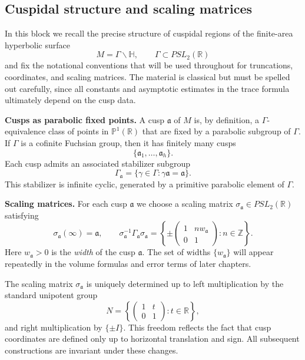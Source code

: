 
\subsection{Cuspidal structure and scaling matrices}

In this block we recall the precise structure of cuspidal regions
of the finite-area hyperbolic surface
\[
  M = \Gamma \backslash \mathbb{H}, \qquad 
  \Gamma \subset PSL_{2}(\mathbb{R})
\]
and fix the notational conventions that will be used throughout
for truncations, coordinates, and scaling matrices. 
The material is classical but must be spelled out carefully,
since all constants and asymptotic estimates in the trace formula
ultimately depend on the cusp data.

\medskip
\noindent
\textbf{Cusps as parabolic fixed points.}
A cusp $\mathfrak{a}$ of $M$ is, by definition, a $\Gamma$-equivalence
class of points in $\mathbb{P}^{1}(\mathbb{R})$ that are fixed by
a parabolic subgroup of $\Gamma$. 
If $\Gamma$ is a cofinite Fuchsian group,
then it has finitely many cusps
\[
  \{\mathfrak{a}_{1}, \dots, \mathfrak{a}_{h}\}.
\]
Each cusp admits an associated stabilizer subgroup
\[
  \Gamma_{\mathfrak{a}} = \{\gamma \in \Gamma : \gamma \mathfrak{a} = \mathfrak{a}\}.
\]
This stabilizer is infinite cyclic, generated by a primitive parabolic
element of $\Gamma$.

\medskip
\noindent
\textbf{Scaling matrices.}
For each cusp $\mathfrak{a}$ we choose a scaling matrix
$\sigma_{\mathfrak{a}} \in PSL_{2}(\mathbb{R})$ satisfying
\[
  \sigma_{\mathfrak{a}}(\infty) = \mathfrak{a},
  \qquad
  \sigma_{\mathfrak{a}}^{-1} \Gamma_{\mathfrak{a}} \sigma_{\mathfrak{a}}
  = \left\{ 
      \pm \begin{pmatrix} 1 & n w_{\mathfrak{a}} \\ 0 & 1 \end{pmatrix}
      : n \in \mathbb{Z} \right\}.
\]
Here $w_{\mathfrak{a}} > 0$ is the \emph{width} of the cusp $\mathfrak{a}$.
The set of widths $\{w_{\mathfrak{a}}\}$ will appear repeatedly
in the volume formulas and error terms of later chapters.

\begin{remark}
The scaling matrix $\sigma_{\mathfrak{a}}$ is uniquely determined up to
left multiplication by the standard unipotent group
\[
  N = \left\{ \begin{pmatrix} 1 & t \\ 0 & 1 \end{pmatrix} : t \in \mathbb{R} \right\},
\]
and right multiplication by $\{\pm I\}$. 
This freedom reflects the fact that cusp coordinates are defined only
up to horizontal translation and sign.
All subsequent constructions are invariant under these changes.
\end{remark}

